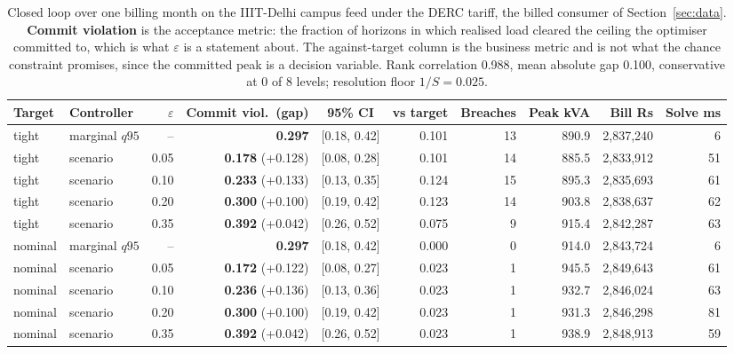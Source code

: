 \begin{table}[t]
\centering
\scriptsize
\setlength{\tabcolsep}{3pt}
\begin{tabular}{llrrcrrrrr}
\toprule
Target & Controller & $\varepsilon$ & Commit viol.\ (gap) & 95\% CI & vs target & Breaches & Peak kVA & Bill Rs & Solve ms \\
\midrule
tight & marginal $q95$ & -- & \textbf{0.297} & [0.18, 0.42] & 0.101 & 13 & 890.9 & 2,837,240 & 6 \\
tight & scenario & 0.05 & \textbf{0.178} (+0.128) & [0.08, 0.28] & 0.101 & 14 & 885.5 & 2,833,912 & 51 \\
tight & scenario & 0.10 & \textbf{0.233} (+0.133) & [0.13, 0.35] & 0.124 & 15 & 895.3 & 2,835,693 & 61 \\
tight & scenario & 0.20 & \textbf{0.300} (+0.100) & [0.19, 0.42] & 0.123 & 14 & 903.8 & 2,838,637 & 62 \\
tight & scenario & 0.35 & \textbf{0.392} (+0.042) & [0.26, 0.52] & 0.075 & 9 & 915.4 & 2,842,287 & 63 \\
nominal & marginal $q95$ & -- & \textbf{0.297} & [0.18, 0.42] & 0.000 & 0 & 914.0 & 2,843,724 & 6 \\
nominal & scenario & 0.05 & \textbf{0.172} (+0.122) & [0.08, 0.27] & 0.023 & 1 & 945.5 & 2,849,643 & 61 \\
nominal & scenario & 0.10 & \textbf{0.236} (+0.136) & [0.13, 0.36] & 0.023 & 1 & 932.7 & 2,846,024 & 63 \\
nominal & scenario & 0.20 & \textbf{0.300} (+0.100) & [0.19, 0.42] & 0.023 & 1 & 931.3 & 2,846,298 & 81 \\
nominal & scenario & 0.35 & \textbf{0.392} (+0.042) & [0.26, 0.52] & 0.023 & 1 & 938.9 & 2,848,913 & 59 \\
\bottomrule
\end{tabular}
\caption{Closed loop over one billing month on the IIIT-Delhi campus feed under the DERC tariff, the billed consumer of Section~\ref{sec:data}. \textbf{Commit violation} is the acceptance metric: the fraction of horizons in which realised load cleared the ceiling the optimiser committed to, which is what $\varepsilon$ is a statement about. The against-target column is the business metric and is not what the chance constraint promises, since the committed peak is a decision variable. Rank correlation 0.988, mean absolute gap 0.100, conservative at 0 of 8 levels; resolution floor $1/S=0.025$.}
\label{tab:acceptance-campus}
\end{table}
